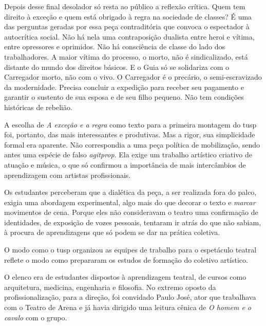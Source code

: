 Depois desse final desolador só resta ao público a reflexão crítica.
Quem tem direito à exceção e quem está obrigado à regra na sociedade de
classes? É uma das perguntas geradas por essa peça contraditória que
convoca o espectador à autocrítica social. Não há nela uma contraposição
dualista entre heroi e vítima, entre opressores e oprimidos. Não há
consciência de classe do lado dos trabalhadores. A maior vítima do
processo, o morto, não é sindicalizado, está distante do mundo dos
direitos básicos. E o Guia só se solidariza com o Carregador morto, não
com o vivo. O Carregador é o precário, o semi-escravizado da
modernidade. Precisa concluir a expedição para receber seu pagamento e
garantir o sustento de sua esposa e de seu filho pequeno. Não tem
condições históricas de rebelião.

A escolha de {\it A exceção e a regra} como texto para a primeira
montagem do {\sc tusp} foi, portanto, das mais interessantes e produtivas. Mas
a rigor, sua simplicidade formal era aparente. Não correspondia a uma
peça política de mobilização, sendo antes uma espécie de falso
{\it agitprop}. Ela exige um trabalho artístico criativo de atuação e
música, o que só confirmou a importância de mais intercâmbios de
aprendizagem com artistas profissionais.

Os estudantes perceberam que a dialética da peça, a ser realizada fora
do palco, exigia uma abordagem experimental, algo mais do que decorar o
texto e {\it marcar} movimentos de cena. Porque eles não consideravam o
teatro uma confirmação de identidades, de exposição de vozes pessoais,
tentaram ir atrás do que não sabiam, à procura de aprendizagens que só
podem se dar na prática coletiva.

\subject{Formação da equipe: artistas-pesquisadores}

O modo como o {\sc tusp} organizou as equipes de trabalho para o espetáculo
teatral reflete o modo como prepararam os estudos de formação do
coletivo artístico.

O elenco era de estudantes dispostos à aprendizagem teatral, de cursos
como arquitetura, medicina, engenharia e filosofia. No extremo oposto da
profissionalização, para a direção, foi convidado Paulo José, ator que
trabalhava com o Teatro de Arena e já havia dirigido uma leitura cênica
de {\it O homem e o cavalo} com o grupo.

